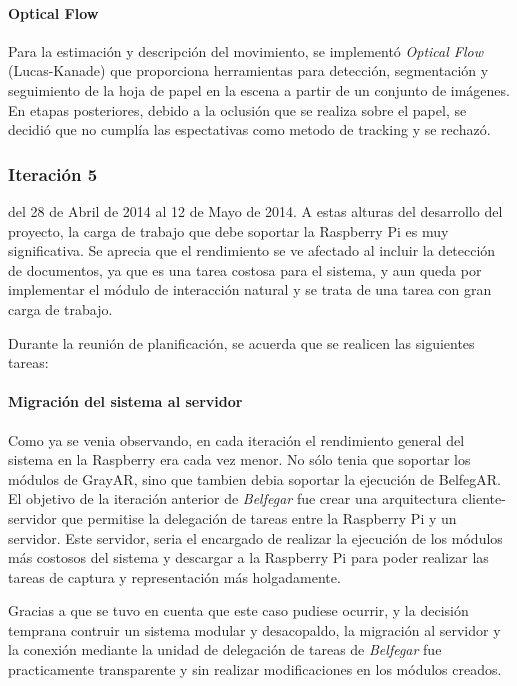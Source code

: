 \paragraph{Optical Flow}
Para la estimación y descripción del movimiento, se implementó \textit{Optical Flow} (Lucas-Kanade) que proporciona herramientas para detección, segmentación y seguimiento de la hoja de papel  en la escena a partir de un conjunto de imágenes. En etapas posteriores, debido a la oclusión que se realiza sobre el papel, se decidió que no cumplía las espectativas como metodo de tracking y se rechazó. 

\subsubsection{Iteración 5}
del 28 de Abril de 2014 al 12 de Mayo de 2014. A estas alturas del desarrollo del proyecto, la carga de trabajo que debe soportar la Raspberry Pi es muy significativa. Se aprecia que el rendimiento se ve afectado al incluir la detección de documentos, ya que es una tarea costosa para el sistema, y aun queda por implementar el módulo de interacción natural y se trata de una tarea con gran carga de trabajo.

Durante la reunión de planificación, se acuerda que se realicen las siguientes tareas:

\paragraph{Migración del sistema al servidor}
Como ya se venia observando, en cada iteración el rendimiento general del sistema en la Raspberry era cada vez menor. No sólo tenia que soportar los módulos de GrayAR, sino que tambien debia soportar la ejecución de BelfegAR. El objetivo de la iteración anterior de \textit{Belfegar} fue crear una arquitectura cliente-servidor que permitise la delegación de tareas entre la Raspberry Pi y un servidor. Este servidor, seria el encargado de realizar la ejecución de los módulos más costosos del sistema y descargar a la Raspberry Pi para poder realizar las tareas de captura y representación más holgadamente.

Gracias a que se tuvo en cuenta que este caso pudiese ocurrir, y la decisión temprana contruir un sistema  modular y desacopaldo, la migración al servidor y la conexión mediante la unidad de delegación de tareas de \textit{Belfegar} fue practicamente transparente y sin realizar modificaciones en los módulos creados.

